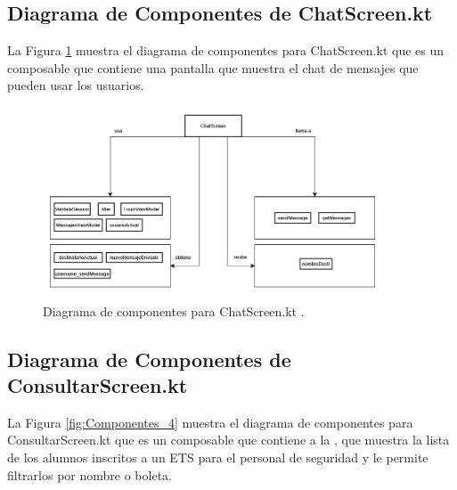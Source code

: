 \newpage

\subsection{Diagrama de Componentes de ChatScreen.kt}

La Figura \ref{fig:Componentes_3} muestra el diagrama de componentes para ChatScreen.kt que es un composable que contiene una pantalla que muestra el chat de mensajes que pueden usar los usuarios.

\begin{figure}[htbp!]
	\begin{center}
		\includegraphics[width=0.9\textwidth]{DiagramasMoviles/DCM (15)}
		\caption{Diagrama de componentes para ChatScreen.kt .}
		\label{fig:Componentes_3}
	\end{center}
\end{figure}

\newpage

\subsection{Diagrama de Componentes de ConsultarScreen.kt}

La Figura \ref{fig:Componentes_4} muestra el diagrama de componentes para ConsultarScreen.kt que es un composable que contiene a la , que muestra la lista de los alumnos inscritos a un ETS para el personal de seguridad y le permite filtrarlos por nombre o boleta.

